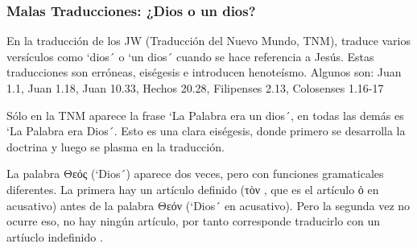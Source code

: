 \documentclass[12pt]{report}
\begin{document}
	\subsubsection{Malas Traducciones: ¿Dios o un dios?}
	
	\begin{minibloque}[Crítica]
		En la traducción de los JW (Traducción del Nuevo Mundo, TNM), traduce varios versículos como `dios´ o `un dios´ cuando se hace referencia a Jesús. Estas traducciones son erróneas, eiségesis e introducen henoteísmo. Algunos son: Juan 1.1, Juan 1.18, Juan 10.33, Hechos 20.28, Filipenses 2.13, Colosenses 1.16-17
	\end{minibloque}
	
	\begin{minibloque}
		Sólo en la TNM aparece la frase `La Palabra era un dios´, en todas las demás es `La Palabra era Dios´. Esto es una clara eiségesis, donde primero se desarrolla la doctrina y luego se plasma en la traducción.
	\end{minibloque}
	
	\begin{subminibloque}[Réplica]
		La palabra \textgreek{Θεός} \textipa{[Te"os]} (`Dios´) aparece dos veces, pero con funciones gramaticales diferentes. La primera hay un artículo definido (\textgreek{τὸν} \textipa{[ton]}, que es el artículo \textgreek{ὁ} en acusativo) antes de la palabra \textgreek{Θεόν} \textipa{[Te"on]} (`Dios´ en acusativo). Pero la segunda vez no ocurre eso, no hay ningún artículo, por tanto corresponde traducirlo con un artíuclo indefinido .
	\end{subminibloque}
	
\end{document}
